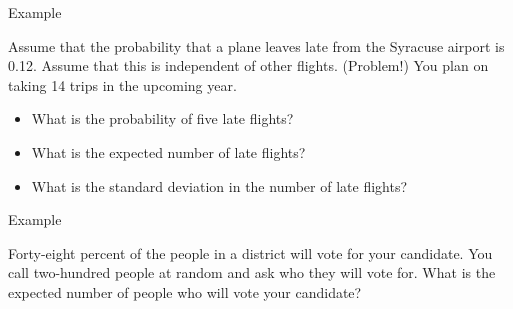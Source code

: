 \begin{frame}{Example}

  Assume that the probability that a plane leaves late from the
  Syracuse airport is 0.12. Assume that this is independent of other
  flights. (Problem!) You plan on taking 14 trips in the upcoming
  year. 

  \begin{itemize}
  \item What is the probability of five late flights?
  \item What is the expected number of late flights?
  \item What is the standard deviation in the number of late flights?
  \end{itemize}
  
\end{frame}

\begin{frame}{Example}

  Forty-eight percent of the people in a district will vote for your
  candidate. You call two-hundred people at random and ask who they
  will vote for. What is the expected number of people who will
  vote your candidate?
  
\end{frame}


